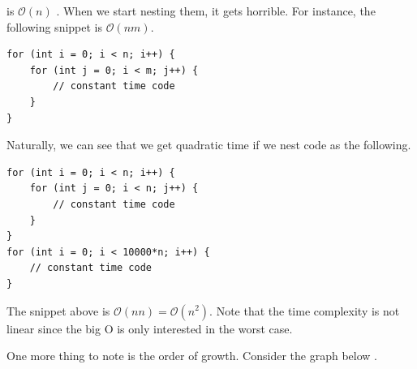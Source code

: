 \documentclass[../../main.tex]{subfiles}
\begin{document}
is $\mathcal{O}(n)$ \cite{CS02-2}. When we start nesting them,
it gets horrible. For instance, the following snippet is
$\mathcal{O}(nm)$.

\begin{basicbox}
\begin{lstlisting}[style=cppstyle]
for (int i = 0; i < n; i++) {
    for (int j = 0; i < m; j++) {
        // constant time code
    }
}
\end{lstlisting}
\end{basicbox}

Naturally, we can see that we get quadratic time if we nest code
as the following.

\begin{basicbox}
\begin{lstlisting}[style=cppstyle]
for (int i = 0; i < n; i++) {
    for (int j = 0; i < n; j++) {
        // constant time code
    }
}
for (int i = 0; i < 10000*n; i++) {
    // constant time code
}
\end{lstlisting}
\end{basicbox}

The snippet above is $\mathcal{O}(nn) = \mathcal{O}(n^2)$. Note that
the time complexity is not linear since the big O is only interested
in the worst case.

One more thing to note is the order of growth. Consider the graph
below \cite{CS02-8}.

\begin{figure}[H]
\centering
{}
\end{figure}
\end{document}
